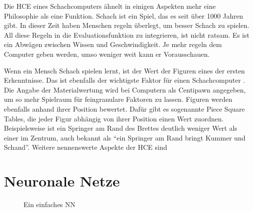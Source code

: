 Die \ac{HCE} eines Schachcomputers ähnelt in einigen Aspekten mehr eine Philosophie als eine Funktion. Schach ist ein Spiel, das es seit über 1000 Jahren gibt. In dieser Zeit haben Menschen regeln überlegt, um besser Schach zu spielen. All diese Regeln in die Evaluationsfunktion zu integrieren, ist nicht ratsam. Es ist ein Abwägen zwischen Wissen und Geschwindigkeit. Je mehr regeln dem Computer geben werden, umso weniger weit kann er Vorausschauen.

Wenn ein Mensch Schach spielen lernt, ist der Wert der Figuren eines der ersten Erkenntnisse. Das ist ebenfalls der wichtigste Faktor für einen Schachcomputer \cite{Levy1988}. Die Angabe der Materialwertung wird bei Computern als Centipawn angegeben, um so mehr Spielraum für feingranulare Faktoren zu lassen. Figuren werden ebenfalls anhand ihrer Position bewertet. Dafür gibt es sogenannte Piece Square Tables, die jeder Figur abhängig von ihrer Position einen Wert zuordnen. Beispielsweise ist ein Springer am Rand des Brettes deutlich weniger Wert als einer im Zentrum, auch bekannt als \enquote{ein Springer am Rand bringt Kummer und Schand}. Weitere nennenswerte Aspekte der \ac{HCE} sind




\section{Neuronale Netze}

\begin{figure}
  \centering
  \caption{Ein einfaches \acl{NN}}
  \label{fig:beispiel-nn}
\end{figure}

